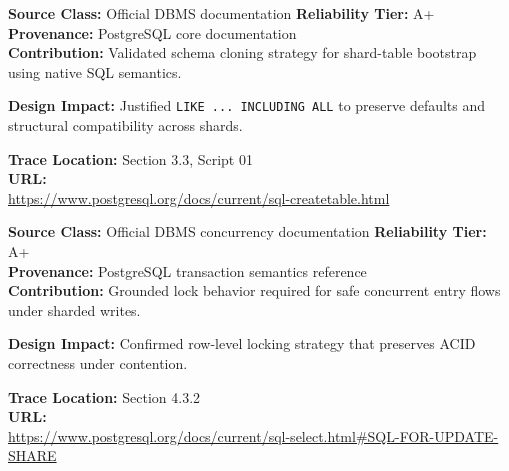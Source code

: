 \documentclass[a4paper,12pt]{article}
\begin{document}
\vspace{5pt}
\noindent
\begin{minipage}[t]{0.49\textwidth}
\begin{tcolorbox}[refdossier,title={\faIcon{book}\ \textbf{R3 \ | \ PostgreSQL CREATE TABLE}},fonttitle=\bfseries,coltitle=iitgnblue]
\scriptsize
\textbf{Source Class:} Official DBMS documentation \hfill \textbf{Reliability Tier:} A+\\
\textbf{Provenance:} PostgreSQL core documentation\\
\textbf{Contribution:} Validated schema cloning strategy for shard-table bootstrap using native SQL semantics.\\
\begin{tcolorbox}[refinsight]
\textbf{Design Impact:} Justified \texttt{LIKE ... INCLUDING ALL} to preserve defaults and structural compatibility across shards.
\end{tcolorbox}
\textbf{Trace Location:} Section 3.3, Script 01\\
\textbf{URL:}\\[-2pt]
\url{https://www.postgresql.org/docs/current/sql-createtable.html}
\end{tcolorbox}
\end{minipage}
\hfill
\begin{minipage}[t]{0.49\textwidth}
\begin{tcolorbox}[refdossier,title={\faIcon{shield-alt}\ \textbf{R4 \ | \ PostgreSQL FOR UPDATE}},fonttitle=\bfseries,coltitle=iitgnblue]
\scriptsize
\textbf{Source Class:} Official DBMS concurrency documentation \hfill \textbf{Reliability Tier:} A+\\
\textbf{Provenance:} PostgreSQL transaction semantics reference\\
\textbf{Contribution:} Grounded lock behavior required for safe concurrent entry flows under sharded writes.\\
\begin{tcolorbox}[refinsight]
\textbf{Design Impact:} Confirmed row-level locking strategy that preserves ACID correctness under contention.
\end{tcolorbox}
\textbf{Trace Location:} Section 4.3.2\\
\textbf{URL:}\\[-2pt]
\url{https://www.postgresql.org/docs/current/sql-select.html\#SQL-FOR-UPDATE-SHARE}
\end{tcolorbox}
\end{minipage}
\end{document}
